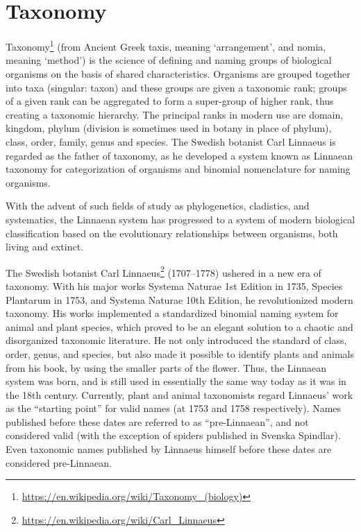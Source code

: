 \documentclass[]{book}
\let\rmarkdownfootnote\footnote%
\def\footnote{\protect\rmarkdownfootnote}
\renewcommand{\href}[2]{#2\footnote{\url{#1}}}
\theoremstyle{definition}
\theoremstyle{definition}
\theoremstyle{definition}
\theoremstyle{remark}
\begin{document}
\section{Taxonomy}\label{taxonomy}

\href{https://en.wikipedia.org/wiki/Taxonomy_(biology)}{Taxonomy} (from
Ancient Greek taxis, meaning `arrangement', and nomia, meaning `method')
is the science of defining and naming groups of biological organisms on
the basis of shared characteristics. Organisms are grouped together into
taxa (singular: taxon) and these groups are given a taxonomic rank;
groups of a given rank can be aggregated to form a super-group of higher
rank, thus creating a taxonomic hierarchy. The principal ranks in modern
use are domain, kingdom, phylum (division is sometimes used in botany in
place of phylum), class, order, family, genus and species. The Swedish
botanist Carl Linnaeus is regarded as the father of taxonomy, as he
developed a system known as Linnaean taxonomy for categorization of
organisms and binomial nomenclature for naming organisms.

With the advent of such fields of study as phylogenetics, cladistics,
and systematics, the Linnaean system has progressed to a system of
modern biological classification based on the evolutionary relationships
between organisms, both living and extinct.

The Swedish botanist
\href{https://en.wikipedia.org/wiki/Carl_Linnaeus}{Carl Linnaeus}
(1707--1778) ushered in a new era of taxonomy. With his major works
Systema Naturae 1st Edition in 1735, Species Plantarum in 1753, and
Systema Naturae 10th Edition, he revolutionized modern taxonomy. His
works implemented a standardized binomial naming system for animal and
plant species, which proved to be an elegant solution to a chaotic and
disorganized taxonomic literature. He not only introduced the standard
of class, order, genus, and species, but also made it possible to
identify plants and animals from his book, by using the smaller parts of
the flower. Thus, the Linnaean system was born, and is still used in
essentially the same way today as it was in the 18th century. Currently,
plant and animal taxonomists regard Linnaeus' work as the ``starting
point'' for valid names (at 1753 and 1758 respectively). Names published
before these dates are referred to as ``pre-Linnaean'', and not
considered valid (with the exception of spiders published in Svenska
Spindlar). Even taxonomic names published by Linnaeus himself before
these dates are considered pre-Linnaean.
\end{document}
